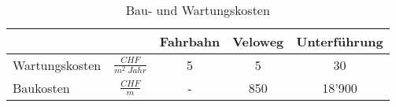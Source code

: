 %
%
%
%

\begin{table}[h!]
\flushleft
\renewcommand{\arraystretch}{1.4}

\begin{tabular}{ @{} lc|ccc @{} }
                 &                         & Fahrbahn  & Veloweg  & Unterführung \\ \hline
Wartungskosten &$\frac{CHF}{m^2 \ Jahr}$ &     5     &     5    &      30        \\
Baukosten        &$\frac{CHF}{m}$ 		   &     -     &   850    &     18'900        
\end{tabular}
\caption{Bau- und Wartungskosten}
\label{tab:t-04-03-01-Unterhalt}
\end{table}

%
%





%


